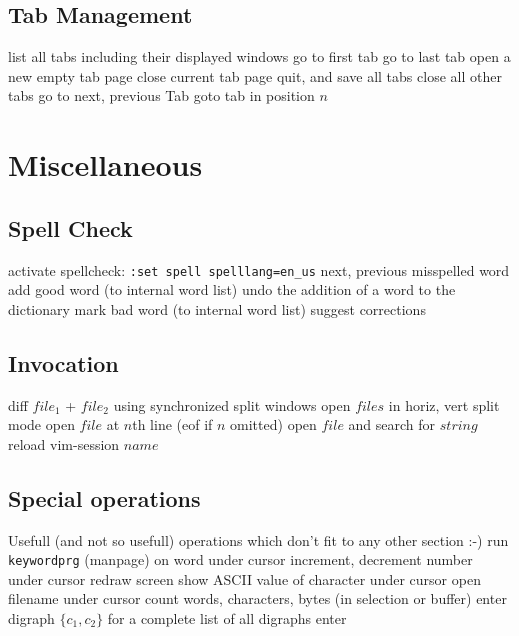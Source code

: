 \subsection{Tab Management}	{}
	{list all tabs including their displayed windows}
	{go to first tab}
	{go to last tab}
	{open a new empty tab page}
	{close current tab page}
	{quit, and save all tabs}
	{close all other tabs}
	{go to next, previous Tab}
	{goto tab in position $n$ }

\section{Miscellaneous}	{}
\subsection{Spell Check}	{activate spellcheck: {\tt :set spell spelllang=en\_us}}
\cmdS{]s\ [s }	{next, previous misspelled word}
	{add good word (to internal word list)}
	{undo the addition of a word to the dictionary}
	{mark bad word (to internal word list)}
	{suggest corrections}

\subsection{Invocation}	{}
	{diff $file_1$ + $file_2$ using synchronized split windows}
	{open $files$ in horiz, vert split mode}
	{open $file$ at $n$th line (eof if $n$ omitted)}
	{open $file$ and search for $string$ }
	{reload vim-session $name$}

\subsection{Special operations}	{Usefull (and not so usefull) operations which don't fit to any other section :-)}
	{run {\tt keywordprg} (manpage) on word under cursor}
	{increment, decrement number under cursor}
	{redraw screen}
	{show A{\smallrm SCII} value of character under cursor}
	{open filename under cursor}
	{count words, characters, bytes (in selection or buffer)}
	{enter digraph $\{c_1,c_2\}$}
	{for a complete list of all digraphs enter}

